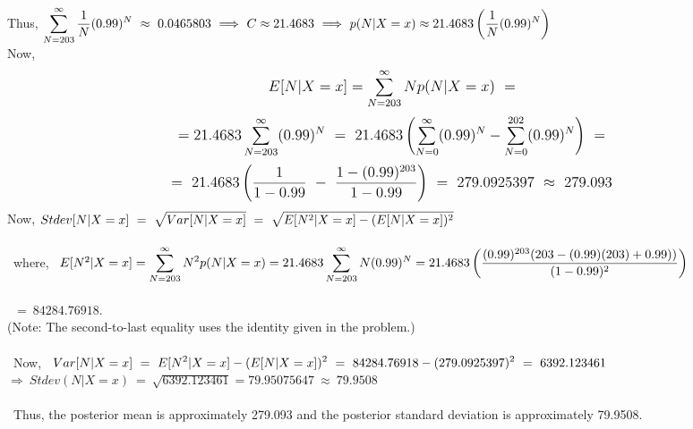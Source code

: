 \documentclass[10pt,a4paper]{article}
\begin{document}
Thus, $\mathlarger{\sum_{N = 203}^{\infty}\frac{1}{N}(0.99)^N \ \approx \ 0.0465803 \ \Longrightarrow \ C \approx 21.4683 \ \Longrightarrow \ p(N\vert X = x) \approx 21.4683 \left(\frac{1}{N}(0.99)^N \right)}$\\
Now, $$\mathlarger{E[N\vert X = x] = \sum_{N = 203}^{\infty}Np(N\vert X = x) \ =}$$  $$\mathlarger{ = 21.4683\sum_{N = 203}^{\infty}(0.99)^N \ = \ 21.4683\left(\sum_{N = 0}^{\infty}(0.99)^N - \sum_{N = 0}^{202}(0.99)^N \right) \ =}$$ $$\mathlarger{= \ 21.4683\left(\frac{1}{1 - 0.99} \ - \ \frac{1 - (0.99)^{203}}{1 - 0.99}\right) \ = \ 279.0925397 \  \approx \ 279.093}$$
Now, $\mathlarger{Stdev[N\vert X = x] \ = \ \sqrt{Var[N\vert X = x]} \ = \ \sqrt{E[N^2 \vert X = x] - (E[N \vert X = x])^2}}$ \\
\\\
where, \ 
$E[N^2 \vert X = x] = \mathlarger{\sum_{N = 203}^{\infty}N^2p(N\vert X = x) = 21.4683\sum_{N = 203}^{\infty}N(0.99)^N = 21.4683\left(\frac{(0.99)^{203}(203 - (0.99)(203) + 0.99))}{(1 - 0.99)^2}\right)}$\\
\\\
$ = \ 84284.76918$. \\ (Note: The second-to-last equality uses the identity given in the problem.) \\ 
\\\
Now, \ $\mathlarger{Var[N\vert X = x] \ = \ E[N^2 \vert X = x] - (E[N \vert X = x])^2 \ = \ 84284.76918 - (279.0925397)^2 \ = \ 6392.123461}$\\
$\Longrightarrow \ Stdev(N\vert X = x) \ = \ \sqrt{6392.123461} = 79.95075647 \ \approx \ 79.9508$\\
\\\
Thus, the posterior mean is approximately 279.093 and the posterior standard deviation is approximately 79.9508.
\end{document}
